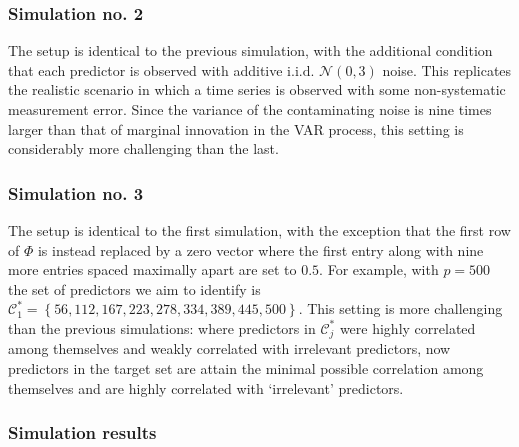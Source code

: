\documentclass[11pt]{report}\usepackage[utf8]{inputenc}
\begin{document}
\subsubsection{Simulation no. 2}

The setup is identical to the previous simulation, with the additional condition that each predictor is observed with additive $\text{i.i.d.}$ $\mathcal{N}(0,3)$ noise. This replicates the realistic scenario in which a time series is observed with some non-systematic measurement error. Since the variance of the contaminating noise is nine times larger than that of marginal innovation in the VAR process, this setting is considerably more challenging than the last. 

\subsubsection{Simulation no. 3}

The setup is identical to the first simulation, with the exception that the first row of $\Phi$ is instead replaced by a zero vector where the first entry along with nine more entries spaced maximally apart are set to $0.5$. For example, with $p=500$ the set of predictors we aim to identify is $\mathcal{C}_1^*=\left \{ 56,112, 167, 223, 278, 334, 389, 445, 500 \right \}$. This setting is more challenging than the previous simulations: where predictors in $\mathcal{C}_j^*$ were highly correlated among themselves and weakly correlated with irrelevant predictors, now predictors in the target set are attain the minimal possible correlation among themselves and are highly correlated with `irrelevant' predictors. 

\subsubsection{Simulation results}
\end{document}
